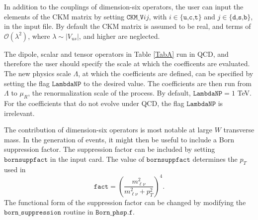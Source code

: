 \documentclass[paper]{JHEP3}
\begin{document}
In addition to the couplings of dimension-six operators, the user can input the elements of the CKM matrix by setting  $\texttt{CKM\_V}ij$, with $i \in \{\texttt{u,c,t}\}$ and $j \in \{ \texttt{d,s,b}\}$,
in the input file. By default the CKM matrix is assumed to be real, and terms of $\mathcal O(\lambda^2)$, where $\lambda \sim |V_{us}|$, and higher are neglected. 

The dipole, scalar and tensor operators in Table \ref{TabA} run in QCD, and therefore the user should specify the scale at which the coefficents are evaluated.
The new physics scale $\Lambda$, at which the coefficients are defined, can be specified 
by setting the flag $\texttt{LambdaNP}$ to the desired value. 
The coefficients are then run from $\Lambda$ to $\mu_R$, the renormalization scale of the  process. By default, $\texttt{LambdaNP} = 1$ TeV.
For the coefficients that do not evolve under QCD, the flag $\texttt{LambdaNP}$ is irrelevant.

The contribution of dimension-six operators is most notable at large $W$ transverse mass. In the generation of events, it might then be useful to include a 
Born suppression factor. The suppression factor can be included by setting   $\texttt{bornsuppfact}$ in the input card. 
The value of  $\texttt{bornsuppfact}$ determines the $p_T$ used in 
\begin{equation}
\texttt{fact} = \left(\frac{m^2_{\ell \nu}}{m^2_{\ell \nu} + p_T^2}\right)^4.
\end{equation}
The functional form of the suppression factor can be changed by modifying the $\texttt{born\_suppression}$ routine in $\texttt{Born\_phsp.f}$.
\end{document}
